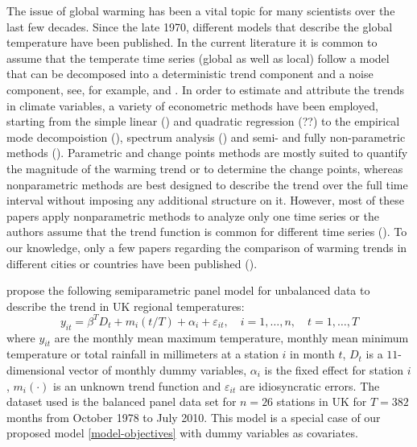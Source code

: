 \documentclass[a4paper,12pt]{article}
\begin{document}
\begin{example}
The issue of global warming has been a vital topic for many scientists over the last few decades. Since the late 1970, different models that describe the global temperature have been published. In the current literature it is common to assume that the temperate time series (global as well as local) follow a model that can be decomposed into a deterministic trend component and a noise component, see, for example, \cite{Ghil1991} and \cite{Mudelsee2018}. In order to estimate and attribute the trends in climate variables, a variety of econometric methods have been employed, starting from the simple linear (\cite{Yue2013}) and quadratic regression (??) to the empirical mode decompoistion (\cite{Wu2011}), spectrum analysis (\cite{Ghil1991}) and semi- and fully non-parametric methods (\cite{Gao2006}). Parametric and change points methods are mostly suited to quantify the magnitude of the warming trend or to determine the change points, whereas nonparametric methods are best designed to describe the trend over the full time interval without imposing any additional structure on it. However, most of these papers apply nonparametric methods to analyze only one time series or the authors assume that the trend function is common for different time series (\cite{Atak2011}). To our knowledge, only a few papers regarding the comparison of warming trends in different cities or countries have been published (\cite{Zhang2012}). 


\cite{Zhang2012} propose the following semiparametric panel model for unbalanced data to describe the trend in UK regional temperatures:
\begin{equation}\label{model-atak}
y_{it} =\beta^{T}D_t + m_i(t/T) + \alpha_i + \varepsilon_{it},\quad i =1, \ldots, n, \quad t=1, \ldots, T
\end{equation}
where $y_{it}$ are the monthly mean maximum temperature, monthly mean minimum temperature or total rainfall in millimeters at a station $i$ in month $t$, $D_t$ is a $11$-dimensional vector of monthly dummy variables, $\alpha_i$ is the fixed effect for station $i$, $m_i(\cdot)$ is an unknown trend function and $\varepsilon_{it}$ are idiosyncratic errors. The dataset used is the balanced panel data set for $n=26$ stations in UK for $T=382$ months from October 1978 to July 2010. This model is a special case of our proposed model \eqref{model-objectives} with dummy variables as covariates.


\end{example}
\end{document}
